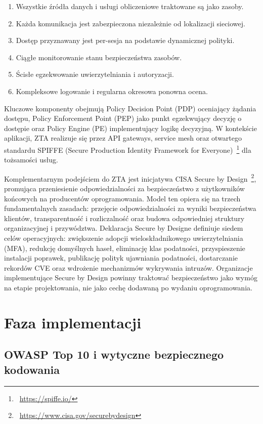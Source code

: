 \begin{enumerate}
\item Wszystkie źródła danych i usługi obliczeniowe traktowane są jako zasoby.
\item Każda komunikacja jest zabezpieczona niezależnie od lokalizacji sieciowej.
\item Dostęp przyznawany jest per-sesja na podstawie dynamicznej polityki.
\item Ciągłe monitorowanie stanu bezpieczeństwa zasobów.
\item Ścisłe egzekwowanie uwierzytelniania i autoryzacji.
\item Kompleksowe logowanie i regularna okresowa ponowna ocena.
\end{enumerate}

Kluczowe komponenty obejmują Policy Decision Point (PDP) oceniający żądania dostępu, Policy Enforcement Point (PEP) jako punkt egzekwujący decyzję o dostępie oraz Policy Engine (PE) implementujący logikę decyzyjną. W kontekście aplikacji, ZTA realizuje się przez API gateways, service mesh oraz otwartego standardu SPIFFE (Secure Production Identity Framework for Everyone)~\footnote{~\url{https://spiffe.io/}} dla tożsamości usług.

Komplementarnym podejściem do ZTA jest inicjatywa CISA Secure by Design~\footnote{~\url{https://www.cisa.gov/securebydesign}}, promująca przeniesienie odpowiedzialności za bezpieczeństwo z użytkowników końcowych na producentów oprogramowania. Model ten opiera się na trzech fundamentalnych zasadach: przejęcie odpowiedzialności za wyniki bezpieczeństwa klientów, transparentność i rozliczalność  oraz budowa odpowiedniej struktury organizacyjnej i przywództwa. Deklaracja Secure by Designe definiuje siedem celów operacyjnych: zwiększenie adopcji wieloskładnikowego uwierzytelniania (MFA), redukcję domyślnych haseł, eliminację klas podatności, przyspieszenie instalacji poprawek, publikację polityk ujawniania podatności, dostarczanie rekordów CVE oraz wdrożenie mechanizmów wykrywania intruzów. Organizacje implementujące Secure by Design powinny traktować bezpieczeństwo jako wymóg na etapie projektowania, nie jako cechę dodawaną po wydaniu oprogramowania.

\section{Faza implementacji}

\subsection{OWASP Top 10 i wytyczne bezpiecznego kodowania}

